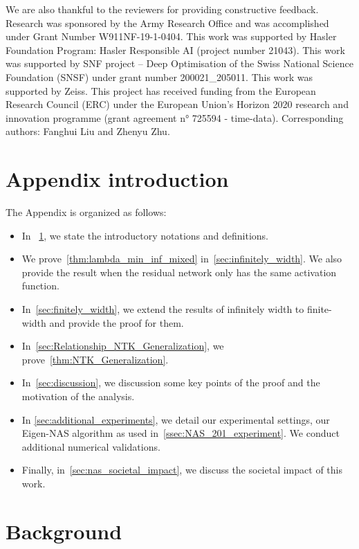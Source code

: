 \documentclass[nohyperref]{article}
\theoremstyle{plain}
\theoremstyle{definition}
\theoremstyle{remark}
\begin{document}
We are also thankful to the reviewers for providing constructive feedback. Research was sponsored by the Army Research Office and was accomplished under Grant Number W911NF-19-1-0404. This work was supported by Hasler Foundation Program: Hasler Responsible AI (project number 21043). This work was supported by SNF project – Deep Optimisation of the Swiss National Science Foundation (SNSF) under grant number 200021\_205011. This work was supported by Zeiss. This project has received funding from the European Research Council (ERC) under the European Union's Horizon 2020 research and innovation programme (grant agreement n° 725594 - time-data). Corresponding authors: Fanghui Liu and Zhenyu Zhu. 
\newpage



\newpage
\appendix
\onecolumn
\allowdisplaybreaks
\section*{Appendix introduction} 
\label{sec:appendix_intro}
The Appendix is organized as follows:
\begin{itemize}
    \item In ~\cref{sec:background}, we state the introductory notations and definitions.
    \item We prove~\cref{thm:lambda_min_inf_mixed} in~\cref{sec:infinitely_width}. We also provide the result when the residual network only has the same activation function.
    \item In~\cref{sec:finitely_width}, we extend the results of infinitely width to finite-width and provide the proof for them.
    \item In~\cref{sec:Relationship_NTK_Generalization}, we prove~\cref{thm:NTK_Generalization}.
    \item In~\cref{sec:discussion}, we discussion some key points of the proof and the motivation of the analysis.
    \item In \cref{sec:additional_experiments}, we detail our experimental settings, our Eigen-NAS algorithm as used in~\cref{ssec:NAS_201_experiment}. We conduct additional numerical validations.
    \item Finally, in~\cref{sec:nas_societal_impact}, we discuss the societal impact of this work.
\end{itemize}


\section{Background}
\label{sec:background}
\end{document}
